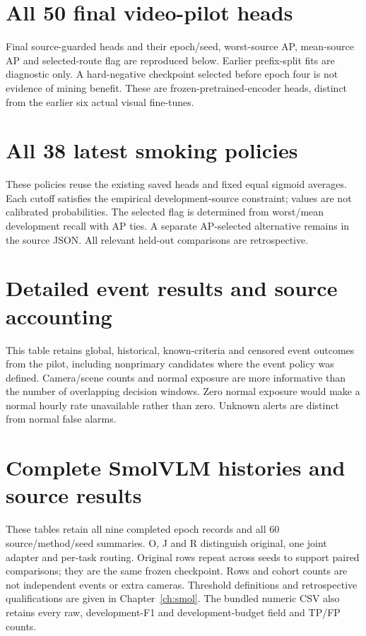 \chapter{All 50 final video-pilot heads}
Final source-guarded heads and their epoch/seed, worst-source AP, mean-source AP and selected-route flag are reproduced below. Earlier prefix-split fits are diagnostic only. A hard-negative checkpoint selected before epoch four is not evidence of mining benefit. These are frozen-pretrained-encoder heads, distinct from the earlier six actual visual fine-tunes.


\chapter{All 38 latest smoking policies}
These policies reuse the existing saved heads and fixed equal sigmoid averages. Each cutoff satisfies the empirical development-source constraint; values are not calibrated probabilities. The selected flag is determined from worst/mean development recall with AP ties. A separate AP-selected alternative remains in the source JSON. All relevant held-out comparisons are retrospective.


\chapter{Detailed event results and source accounting}
This table retains global, historical, known-criteria and censored event outcomes from the pilot, including nonprimary candidates where the event policy was defined. Camera/scene counts and normal exposure are more informative than the number of overlapping decision windows. Zero normal exposure would make a normal hourly rate unavailable rather than zero. Unknown alerts are distinct from normal false alarms.



\chapter{Complete SmolVLM histories and source results}
These tables retain all nine completed epoch records and all 60 source/method/seed summaries. O, J and R distinguish original, one joint adapter and per-task routing. Original rows repeat across seeds to support paired comparisons; they are the same frozen checkpoint. Rows and cohort counts are not independent events or extra cameras. Threshold definitions and retrospective qualifications are given in Chapter~\ref{ch:smol}. The bundled numeric CSV also retains every raw, development-F1 and development-budget field and TP/FP counts.



